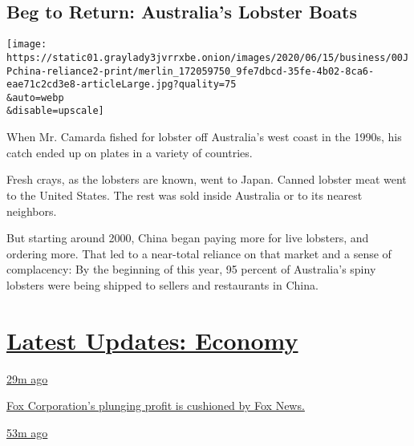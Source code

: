 \hypertarget{beg-to-return-australias-lobster-boats}{%
\subsection{Beg to Return: Australia's Lobster
Boats}\label{beg-to-return-australias-lobster-boats}}

\texttt{[image: https://static01.graylady3jvrrxbe.onion/images/2020/06/15/business/00JPchina-reliance2-print/merlin\_172059750\_9fe7dbcd-35fe-4b02-8ca6-eae71c2cd3e8-articleLarge.jpg?quality=75\\\&auto=webp\\\&disable=upscale]}

When Mr. Camarda fished for lobster off Australia's west coast in the
1990s, his catch ended up on plates in a variety of countries.

Fresh crays, as the lobsters are known, went to Japan. Canned lobster
meat went to the United States. The rest was sold inside Australia or to
its nearest neighbors.

But starting around 2000, China began paying more for live lobsters, and
ordering more. That led to a near-total reliance on that market and a
sense of complacency: By the beginning of this year, 95 percent of
Australia's spiny lobsters were being shipped to sellers and restaurants
in China.

\hypertarget{latest-updates-economy}{%
\section{\texorpdfstring{\href{https://www.nytimes3xbfgragh.onion/live/2020/08/04/business/stock-market-today-coronavirus?action=click\&pgtype=Article\&state=default\&region=MAIN_CONTENT_1\&context=storylines_live_updates}{Latest
Updates:
Economy}}{Latest Updates: Economy}}\label{latest-updates-economy}}

\href{https://www.nytimes3xbfgragh.onion/live/2020/08/04/business/stock-market-today-coronavirus?action=click\&pgtype=Article\&state=default\&region=MAIN_CONTENT_1\&context=storylines_live_updates\#fox-corporations-plunging-profit-is-cushioned-by-fox-news}{29m
ago}

\href{https://www.nytimes3xbfgragh.onion/live/2020/08/04/business/stock-market-today-coronavirus?action=click\&pgtype=Article\&state=default\&region=MAIN_CONTENT_1\&context=storylines_live_updates\#fox-corporations-plunging-profit-is-cushioned-by-fox-news}{Fox
Corporation's plunging profit is cushioned by Fox News.}

\href{https://www.nytimes3xbfgragh.onion/live/2020/08/04/business/stock-market-today-coronavirus?action=click\&pgtype=Article\&state=default\&region=MAIN_CONTENT_1\&context=storylines_live_updates\#trading-in-kodak-shares-comes-under-scrutiny}{53m
ago}


